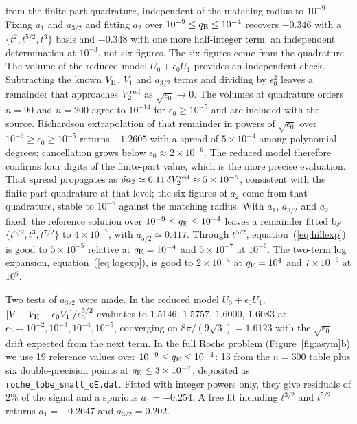 \documentclass[twocolumn]{aastex702}
\newcommand{\qE}{q_{\rm E}}
\begin{document}
from the finite-part quadrature, independent of the matching radius to $10^{-9}$. Fixing $a_1$ and $a_{3/2}$ and fitting $a_2$ over $10^{-9}\le\qE\le10^{-4}$ recovers $-0.346$ with a $\{t^2,t^{5/2},t^3\}$ basis and $-0.348$ with one more half-integer term: an independent determination at $10^{-3}$, not six figures. The six figures come from the quadrature. The volume of the reduced model $U_0+\epsilon_0 U_1$ provides an independent check. Subtracting the known $V_{\rm H}$, $V_1$ and $a_{3/2}$ terms and dividing by $\epsilon_0^2$ leaves a remainder that approaches $V_2^{\rm red}$ as $\sqrt{\epsilon_0}\to0$. The volumes at quadrature orders $n=90$ and $n=200$ agree to $10^{-14}$ for $\epsilon_0\ge10^{-5}$ and are included with the source. Richardson extrapolation of that remainder in powers of $\sqrt{\epsilon_0}$ over $10^{-3}\ge\epsilon_0\ge10^{-5}$ returns $-1.2605$ with a spread of $5\times10^{-4}$ among polynomial degrees; cancellation grows below $\epsilon_0\approx2\times10^{-6}$. The reduced model therefore confirms four digits of the finite-part value, which is the more precise evaluation. That spread propagates as $\delta a_2\simeq0.11\,\delta V_2^{\rm red}\approx5\times10^{-5}$, consistent with the finite-part quadrature at that level; the six figures of $a_2$ come from that quadrature, stable to $10^{-9}$ against the matching radius. With $a_1$, $a_{3/2}$ and $a_2$ fixed, the reference solution over $10^{-9}\le\qE\le10^{-4}$ leaves a remainder fitted by $\{t^{5/2},t^3,t^{7/2}\}$ to $4\times10^{-7}$, with $a_{5/2}\simeq0.417$. Through $t^{5/2}$, equation~(\ref{eq:hillexp}) is good to $5\times10^{-5}$ relative at $\qE=10^{-4}$ and $5\times10^{-7}$ at $10^{-6}$. The two-term log expansion, equation~(\ref{eq:logexp}), is good to $2\times10^{-4}$ at $\qE=10^{4}$ and $7\times10^{-6}$ at $10^{6}$.

Two tests of $a_{3/2}$ were made. In the reduced model $U_0+\epsilon_0 U_1$, $[V-V_{\rm H}-\epsilon_0 V_1]/\epsilon_0^{3/2}$ evaluates to $1.5146$, $1.5757$, $1.6000$, $1.6083$ at $\epsilon_0=10^{-2},10^{-3},10^{-4},10^{-5}$, converging on $8\pi/(9\sqrt3)=1.6123$ with the $\sqrt{\epsilon_0}$ drift expected from the next term. In the full Roche problem (Figure~\ref{fig:asym}b) we use 19 reference values over $10^{-9}\le\qE\le10^{-4}$: 13 from the $n=300$ table plus six double-precision points at $\qE\le3\times10^{-7}$, deposited as \texttt{roche\_lobe\_small\_qE.dat}. Fitted with integer powers only, they give residuals of $2\%$ of the signal and a spurious $a_1=-0.254$. A free fit including $t^{3/2}$ and $t^{5/2}$ returns $a_1=-0.2647$ and $a_{3/2}=0.202$.
\end{document}
